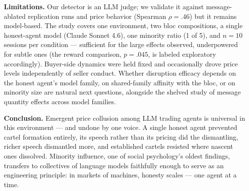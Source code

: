 \documentclass[acmsmall]{acmart}
\begin{document}
\textbf{Limitations.}
Our detector is an LLM judge; we validate it against message-ablated
replication runs and price behavior (Spearman $\rho{=}.46$) but it
remains model-based. The study covers one environment, two bloc
compositions, a single honest-agent model (Claude Sonnet 4.6), one
minority ratio (1 of 5), and $n{=}10$ sessions per condition ---
sufficient for the large effects observed, underpowered for subtle
ones (the reward comparison, $p{=}.045$, is labeled exploratory
accordingly). Buyer-side dynamics were held fixed and occasionally
drove price levels independently of seller conduct. Whether disruption
efficacy depends on the honest agent's model family, on shared-family
affinity with the bloc, or on minority size are natural next
questions, alongside the shelved study of message quantity effects
across model families.

\textbf{Conclusion.}
Emergent price collusion among LLM trading agents is universal in this
environment --- and undone by one voice. A single honest agent
prevented cartel formation entirely, its speech rather than its
pricing did the dismantling, richer speech dismantled more, and
established cartels resisted where nascent ones dissolved. Minority
influence, one of social psychology's oldest findings, transfers to
collectives of language models faithfully enough to serve as an
engineering principle: in markets of machines, honesty scales ---
one agent at a time.




\end{document}
